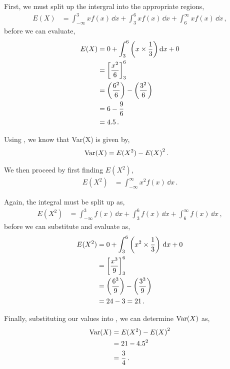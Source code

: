 \begin{subquestions}
\begin{subsubquestions}
First, we must split up the intergral into the appropriate regions,
\begin{align}
	E(X)& = \int_{-\infty}^{3}x f(x)\,\dd x + \int_{3}^{6}x f(x)\,\dd x +\int_{6}^{\infty}x f(x)\,\dd x \,,
\end{align}
before we can evaluate,
\begin{align}
	E(X)& = 0+ \int_{3}^{6} \left(x \times \frac{1}{3} \right)\mathrm{d} x+ 0\nonumber \\
	    & = \left[\frac{x^2}{6} \right]^{6}_{3} \nonumber \\
	    & = \left( \frac{6^2}{6} \right) - \left( \frac{3^2}{6} \right) \nonumber \\
	    & = 6 - \frac{9}{6} \nonumber \\
	    & = 4.5 \,.
\end{align}


\subsubquestion

Using , we know that Var(X) is given by,
\begin{align}
	\text{Var}(X) & = E(X^2) - {E(X)}^2\, . \label{2010:q3:Var}
\end{align}

We then proceed by first finding $E(X^2)$,
\begin{align}
	E(X^2)& = \int_{-\infty}^{\infty}x^2 f(x) \, \dd x\,.
\end{align}

Again, the integral must be split up as,
\begin{align}
	E(X^2) &= \int_{-\infty}^3 f(x) \, \dd x + \int_{3}^6 f(x) \, \dd x + \int_6^\infty f(x) \, \dd x \,,
\end{align}
before we can substitute and evaluate as,
\begin{align}
E(X^2) & = 0+ \int_{3}^{6} \left( x^2 \times \frac{1}{3} \right) \, \mathrm{d} x \nonumber + 0 \\
		 & = \left[\frac{x^3}{9} \right]^{6}_{3} \nonumber \\
		 & = \left( \frac{6^3}{9} \right) - \left( \frac{3^3}{9} \right) \nonumber \\
		 & = 24 -3=21 \,.
\end{align}

Finally, substituting our values into , we can determine $\text{Var}(X)$ as,
\begin{align}
\text{Var}(X) & = E(X^2) - {E(X)}^2 \nonumber \\
& = 21 - 4.5^2 \nonumber \\
& = \frac{3}{4} \,.
\end{align}

\end{subsubquestions}

\end{subquestions}